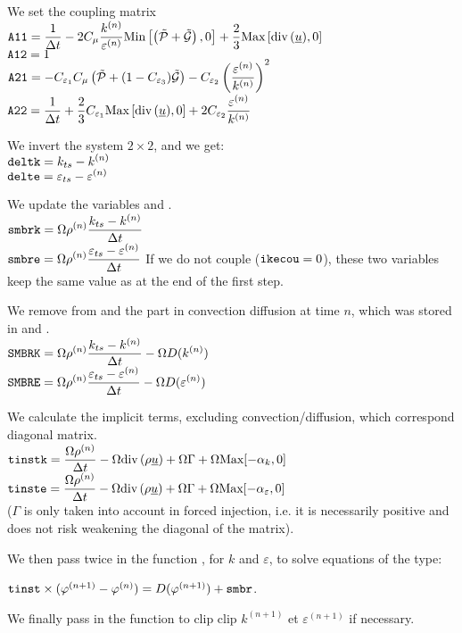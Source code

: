 We set the coupling matrix\\
$\displaystyle \text{\texttt{A11}}=\frac{1}{\Delta t}
-2 C_\mu\frac{k^{(n)}}{\varepsilon^{(n)}}
\text{Min}\left[\left(\tilde{\mathcal{P}}+\tilde{\mathcal{G}}\right),0\right]
+\frac{2}{3}\text{Max}\left[\text{div}\,(\underline{u}),0\right]$\\
$\displaystyle \text{\texttt{A12}}= 1$\\
$\displaystyle \text{\texttt{A21}}=
- C_{\varepsilon_1} C_\mu \left(\tilde{\mathcal{P}}
+(1-C_{\varepsilon_3})\tilde{\mathcal{G}}\right)
- C_{\varepsilon_2}\left(\frac{\varepsilon^{(n)}}{k^{(n)}}\right)^2$\\
$\displaystyle \text{\texttt{A22}}=\frac{1}{\Delta t}
+\frac{2}{3}C_{\varepsilon_1}\text{Max}\left[\text{div}\,(\underline{u}),0\right]
+2 C_{\varepsilon_2}\frac{\varepsilon^{(n)}}{k^{(n)}}$

We invert the system $2\times 2$, and we get:\\
$\displaystyle \text{\texttt{deltk}}=k_{ts}-k^{(n)}$\\
$\displaystyle \text{\texttt{delte}}=\varepsilon_{ts}-\varepsilon^{(n)}$

We update the variables  and .\\
$\displaystyle \text{\texttt{smbrk}}=\Omega \rho^{(n)}\frac{k_{ts}-k^{(n)}}{\Delta t}$\\
$\displaystyle \text{\texttt{smbre}}=
\Omega \rho^{(n)}\frac{\varepsilon_{ts}-\varepsilon^{(n)}}{\Delta t}$
If we do not couple ($\text{\texttt{ikecou}}=0$), these two variables keep
the same value as at the end of the first step.

We remove from  and  the part in convection diffusion at
time $n$, which was stored in  and .\\
$\displaystyle \text{\texttt{SMBRK}}=\Omega \rho^{(n)}\frac{k_{ts}-k^{(n)}}{\Delta t}
-\Omega D(k^{(n)})$\\
$\displaystyle \text{\texttt{SMBRE}}=
\Omega \rho^{(n)}\frac{\varepsilon_{ts}-\varepsilon^{(n)}}{\Delta t}
-\Omega D(\varepsilon^{(n)})$

We calculate the implicit terms, excluding convection/diffusion, which correspond
diagonal matrix.\\

$\displaystyle \text{\texttt{tinstk}}=\frac{\Omega \rho^{(n)}}{\Delta t}
-\Omega\text{div}\,(\rho\underline{u})+\Omega\Gamma+\Omega\text{Max}[-\alpha_k,0]$\\
$\displaystyle \text{\texttt{tinste}}=\frac{\Omega \rho^{(n)}}{\Delta t}
-\Omega\text{div}\,(\rho\underline{u})+\Omega\Gamma+\Omega\text{Max}[-\alpha_\varepsilon,0]$\\
($\Gamma$ is only taken into account in forced injection, i.e. it
is necessarily positive and does not risk weakening the diagonal of the matrix).

We then pass twice in the function , for $k$ and $\varepsilon$,
to solve equations of the type:

$\text{\texttt{tinst}}\times(\varphi^{(n+1)}-\varphi^{(n)}) = D(\varphi^{(n+1)})+\text{\texttt{smbr}}$.

We finally pass in the function  to clip
clip $k^{(n+1)}$ et $\varepsilon^{(n+1)}$ if necessary.
